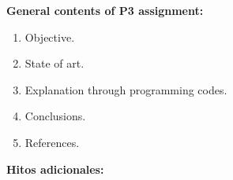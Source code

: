 \documentclass[12pt,spanish]{article}
\begin{document}
\vspace{0.5cm} 
\noindent
{\bf \Large General contents of P3 assignment: 
}                                                                               
     
\begin{enumerate}
 \setlength{\itemsep}{-0.1cm}
\item Objective. 
\item State of art. 
\item Explanation through programming codes. 
\item Conclusions. 
\item References. 
\end{enumerate}

\vspace{0.5cm}
\noindent
{\bf \Large Hitos adicionales:
}
\end{document}
